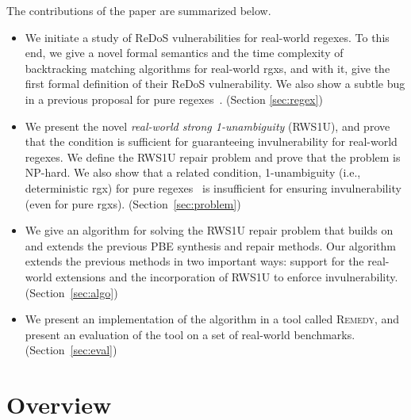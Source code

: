 \documentclass[conference]{IEEEtran}
\newcommand{\tool}{\textsc{Remedy}}
\newcommand{\ltp}{RWS1U}
\begin{document}
The contributions of the paper are summarized below.
\begin{itemize}
\item We initiate a study of ReDoS vulnerabilities for real-world regexes. To this end, we give a novel formal semantics and the time complexity of backtracking matching algorithms for real-world {rgxs}, and with it, give the first formal definition of their ReDoS vulnerability.  We also show a subtle bug in a previous proposal for pure regexes~\cite{10.1007/978-3-662-54580-5_1}. (Section \ref{sec:regex})


\item We present the novel {\em real-world strong 1-unambiguity} (\ltp{}), and prove that the condition is sufficient for guaranteeing invulnerability for real-world regexes.  We define the \ltp{} repair problem and prove that the problem is NP-hard.  We also show that a related condition, 1-unambiguity (i.e., deterministic {rgx}) for pure regexes~\cite{BRUGGEMANNKLEIN1998182,FlashRegex,10.1007/3-540-57273-2_45} is insufficient for ensuring invulnerability (even for pure {rgxs}). (Section~\ref{sec:problem})

\item We give an algorithm for solving the \ltp{} repair problem that builds on and extends the previous PBE synthesis and repair methods.  Our algorithm extends the previous methods in two important ways: support for the real-world extensions and the incorporation of \ltp{} to enforce invulnerability. (Section~\ref{sec:algo})

\item We present an implementation of the algorithm in a tool called \tool{}, and present an evaluation of the tool on a set of real-world benchmarks. (Section~\ref{sec:eval})

\end{itemize}









 
\section{Overview}
\label{sec:example}
\end{document}
